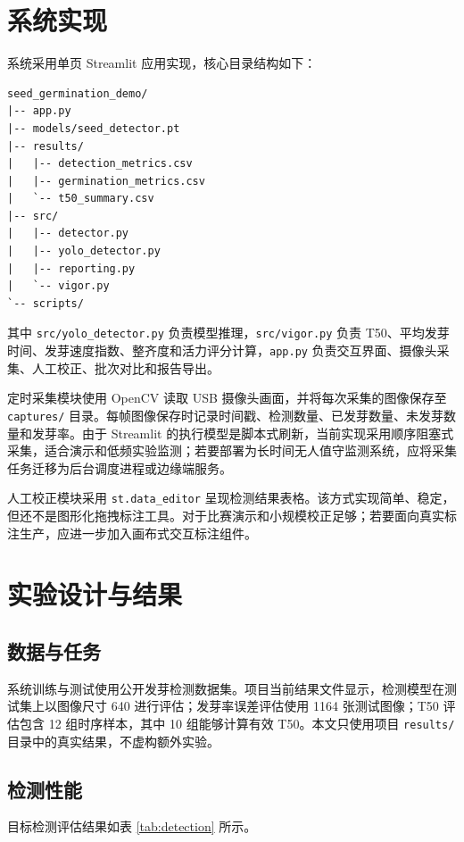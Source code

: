 \documentclass[UTF8,a4paper,zihao=-4]{ctexart}
\begin{document}
\section{系统实现}

系统采用单页 Streamlit 应用实现，核心目录结构如下：
\begin{lstlisting}
seed_germination_demo/
|-- app.py
|-- models/seed_detector.pt
|-- results/
|   |-- detection_metrics.csv
|   |-- germination_metrics.csv
|   `-- t50_summary.csv
|-- src/
|   |-- detector.py
|   |-- yolo_detector.py
|   |-- reporting.py
|   `-- vigor.py
`-- scripts/
\end{lstlisting}

其中 \texttt{src/yolo\_detector.py} 负责模型推理，\texttt{src/vigor.py} 负责 T50、平均发芽时间、发芽速度指数、整齐度和活力评分计算，\texttt{app.py} 负责交互界面、摄像头采集、人工校正、批次对比和报告导出。

定时采集模块使用 OpenCV 读取 USB 摄像头画面，并将每次采集的图像保存至 \texttt{captures/} 目录。每帧图像保存时记录时间戳、检测数量、已发芽数量、未发芽数量和发芽率。由于 Streamlit 的执行模型是脚本式刷新，当前实现采用顺序阻塞式采集，适合演示和低频实验监测；若要部署为长时间无人值守监测系统，应将采集任务迁移为后台调度进程或边缘端服务。

人工校正模块采用 \texttt{st.data\_editor} 呈现检测结果表格。该方式实现简单、稳定，但还不是图形化拖拽标注工具。对于比赛演示和小规模校正足够；若要面向真实标注生产，应进一步加入画布式交互标注组件。

\section{实验设计与结果}

\subsection{数据与任务}

系统训练与测试使用公开发芽检测数据集。项目当前结果文件显示，检测模型在测试集上以图像尺寸 640 进行评估；发芽率误差评估使用 1164 张测试图像；T50 评估包含 12 组时序样本，其中 10 组能够计算有效 T50。本文只使用项目 \texttt{results/} 目录中的真实结果，不虚构额外实验。

\subsection{检测性能}

目标检测评估结果如表 \ref{tab:detection} 所示。
\end{document}
